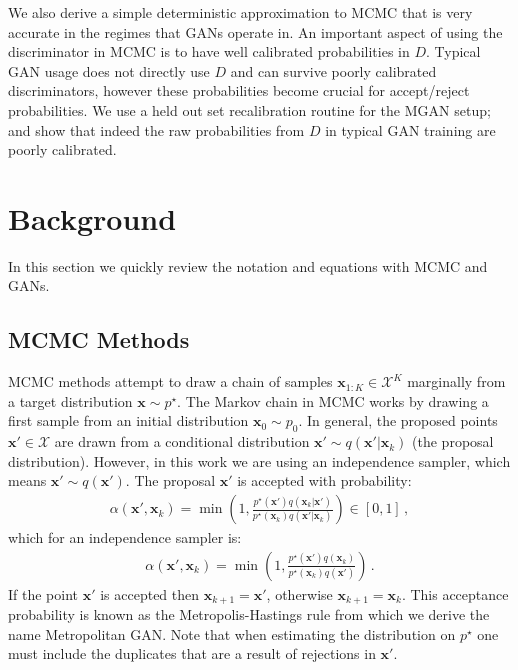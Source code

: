 \documentclass{article}
\renewcommand{\vec}[1]{{\boldsymbol{\mathbf{#1}}}} %
\newcommand{\set}[1]{\mathcal{#1}}
\newcommand{\sample}{\sim}
\newcommand{\given}{|}
\newcommand{\target}{{p^\star}}
\newcommand{\prop}{q}
\newcommand{\pinit}{{p_0}}
\newcommand{\accept}{\alpha}
\newcommand{\setx}{\set{X}}
\begin{document}

We also derive a simple deterministic approximation to MCMC that is very accurate in the regimes that GANs operate in.
An important aspect of using the discriminator in MCMC is to have well calibrated probabilities in $D$.
Typical GAN usage does not directly use $D$ and can survive poorly calibrated discriminators, however these probabilities become crucial for accept/reject probabilities.
We use a held out set recalibration routine for the MGAN setup; and show that indeed the raw probabilities from $D$ in typical GAN training are poorly calibrated.

\section{Background}

In this section we quickly review the notation and equations with MCMC and GANs.

\subsection{MCMC Methods}

MCMC methods attempt to draw a chain of samples $\vec x_{1:K} \in \setx^K$ marginally from a target distribution $\vec x \sample \target$.
The Markov chain in MCMC works by drawing a first sample from an initial distribution $\vec x_0 \sample \pinit$.
In general, the proposed points $\vec x' \in \setx$ are drawn from a conditional distribution $\vec x' \sample \prop(\vec x' \given \vec x_k)$ (the proposal distribution)\@.
However, in this work we are using an independence sampler, which means $\vec x' \sample \prop(\vec x')$.
The proposal $\vec x'$ is accepted with probability:
\begin{align}
  \accept(\vec x', \vec x_k) = \min\left(1, \frac{\target(\vec x')\prop(\vec x_k \given \vec x')}{\target(\vec x_k)\prop(\vec x' \given \vec x_k)}\right) \in [0,1]\,,
\end{align}
which for an independence sampler is:
\begin{align}
  \accept(\vec x', \vec x_k) = \min\left(1, \frac{\target(\vec x')\prop(\vec x_k)}{\target(\vec x_k)\prop(\vec x')}\right)\,.
\end{align}
If the point $\vec x'$ is accepted then $\vec x_{k+1} = \vec x'$, otherwise $\vec x_{k+1} = \vec x_k$.
This acceptance probability is known as the Metropolis-Hastings rule from which we derive the name Metropolitan GAN\@.
Note that when estimating the distribution on $\target$ one must include the duplicates that are a result of rejections in $\vec x'$.
\end{document}
